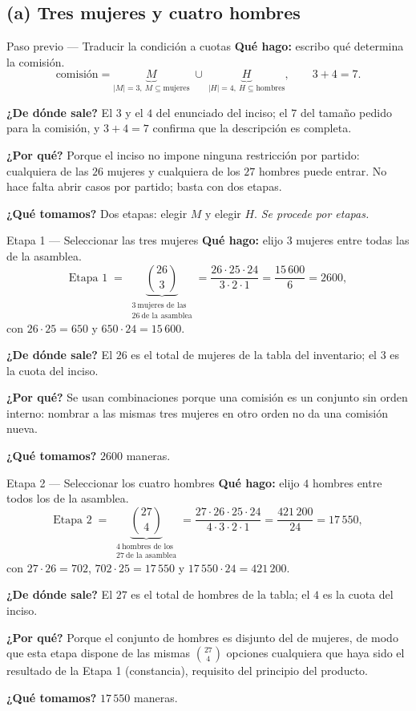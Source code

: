 \documentclass[11pt]{article}
\begin{document}
\subsection*{(a) Tres mujeres y cuatro hombres}

\begin{paso}{Paso previo --- Traducir la condici\'on a cuotas}
\textbf{Qu\'e hago:} escribo qu\'e determina la comisi\'on.
\[
\text{comisi\'on}=\underbrace{M}_{|M|=3,\ M\subseteq\text{mujeres}}\;\cup\;\underbrace{H}_{|H|=4,\ H\subseteq\text{hombres}},\qquad 3+4=7 .
\]

\textbf{¿De d\'onde sale?} El $3$ y el $4$ del enunciado del inciso; el $7$ del tama\~no pedido para la
comisi\'on, y $3+4=7$ confirma que la descripci\'on es completa.

\textbf{¿Por qu\'e?} Porque el inciso no impone ninguna restricci\'on por partido: cualquiera de las $26$
mujeres y cualquiera de los $27$ hombres puede entrar. No hace falta abrir casos por partido; basta con dos
etapas.

\textbf{¿Qu\'e tomamos?} Dos etapas: elegir $M$ y elegir $H$. \emph{Se procede por etapas.}
\end{paso}

\begin{paso}{Etapa 1 --- Seleccionar las tres mujeres}
\textbf{Qu\'e hago:} elijo $3$ mujeres entre todas las de la asamblea.
\[
\text{Etapa 1}\;=\;\underbrace{\binom{26}{3}}_{\substack{3\ \text{mujeres de las}\\ 26\ \text{de la asamblea}}}
=\frac{26\cdot 25\cdot 24}{3\cdot 2\cdot 1}=\frac{15\,600}{6}=2600 ,
\]
con $26\cdot 25=650$ y $650\cdot 24=15\,600$.

\textbf{¿De d\'onde sale?} El $26$ es el total de mujeres de la tabla del inventario; el $3$ es la cuota del
inciso.

\textbf{¿Por qu\'e?} Se usan combinaciones porque una comisi\'on es un conjunto sin orden interno: nombrar a
las mismas tres mujeres en otro orden no da una comisi\'on nueva.

\textbf{¿Qu\'e tomamos?} $2600$ maneras.
\end{paso}

\begin{paso}{Etapa 2 --- Seleccionar los cuatro hombres}
\textbf{Qu\'e hago:} elijo $4$ hombres entre todos los de la asamblea.
\[
\text{Etapa 2}\;=\;\underbrace{\binom{27}{4}}_{\substack{4\ \text{hombres de los}\\ 27\ \text{de la asamblea}}}
=\frac{27\cdot 26\cdot 25\cdot 24}{4\cdot 3\cdot 2\cdot 1}=\frac{421\,200}{24}=17\,550 ,
\]
con $27\cdot 26=702$, $702\cdot 25=17\,550$ y $17\,550\cdot 24=421\,200$.

\textbf{¿De d\'onde sale?} El $27$ es el total de hombres de la tabla; el $4$ es la cuota del inciso.

\textbf{¿Por qu\'e?} Porque el conjunto de hombres es disjunto del de mujeres, de modo que esta etapa
dispone de las mismas $\binom{27}{4}$ opciones cualquiera que haya sido el resultado de la Etapa 1
(constancia), requisito del principio del producto.

\textbf{¿Qu\'e tomamos?} $17\,550$ maneras.
\end{paso}
\end{document}
